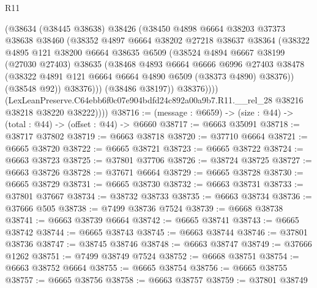 \begin{lexlean}{R11}
\begin{coremodule}
                  (@38634
                    (@38445 @38638)
                    @38426
                    (@38450
                      @4898
                      @6664
                      @38203
                      @37373
                      @38638
                      @38460
                      (@38352
                        @4897
                        @6664
                        @38202
                        @27218
                        @38637
                        @38364
                        (@38322
                          @4895
                          @121
                          @38200
                          @6664
                          @38635
                          @6509
                          (@38524
                            @4894
                            @6667
                            @38199
                            (@27030 @27403)
                            @38635
                            (@38468
                              @4893
                              @6664
                              @6666
                              @6996
                              @27403
                              @38478
                              (@38322 @4891 @121 @6664 @6664 @4890 @6509 (@38373 @4890) @38376))
                            (@38548 @92))
                          @38376)))
                    (@38486 @38197))
                  @38376))))
          (LexLeanPreserve.C64ebb6f0c07e904bdfd24c892a00a9b7.R11.__rel_28
            @38216
            @38218
            @38220
            @38222))))
@38716 := (message : @6659) -> (size : @44) -> (total : @44) -> (offset : @44) -> @6660
@38717 := @6663 @35091
@38718 := @38717 @37802
@38719 := @6663 @38718
@38720 := @37710 @6664
@38721 := @6665 @38720
@38722 := @6665 @38721
@38723 := @6665 @38722
@38724 := @6663 @38723
@38725 := @37801 @37706
@38726 := @38724 @38725
@38727 := @6663 @38726
@38728 := @37671 @6664
@38729 := @6665 @38728
@38730 := @6665 @38729
@38731 := @6665 @38730
@38732 := @6663 @38731
@38733 := @37801 @37667
@38734 := @38732 @38733
@38735 := @6663 @38734
@38736 := @37666 @505
@38738 := @7499 @38736 @7524
@38739 := @6668 @38738
@38741 := @6663 @38739 @6664
@38742 := @6665 @38741
@38743 := @6665 @38742
@38744 := @6665 @38743
@38745 := @6663 @38744
@38746 := @37801 @38736
@38747 := @38745 @38746
@38748 := @6663 @38747
@38749 := @37666 @1262
@38751 := @7499 @38749 @7524
@38752 := @6668 @38751
@38754 := @6663 @38752 @6664
@38755 := @6665 @38754
@38756 := @6665 @38755
@38757 := @6665 @38756
@38758 := @6663 @38757
@38759 := @37801 @38749

\end{coremodule}
\end{lexlean}
